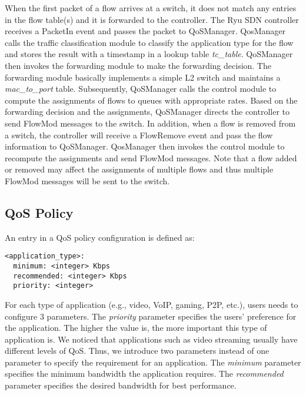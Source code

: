 When the first packet of a flow arrives at a switch, it does not match any entries in the flow table(s) and
it is forwarded to the controller. The Ryu SDN controller receives a \textsf{PacketIn} event and passes the
packet to QoSManager. QosManager calls the traffic classification module to classify the application type for
the flow and stores the result with a timestamp in a lookup table \emph{tc\_table}. QoSManager then invokes
the forwarding module to make the forwarding decision. The forwarding module basically implements a simple L2
switch and maintains a \emph{mac\_to\_port} table. Subsequently, QoSManager calls the control module to compute
the assignments of flows to queues with appropriate rates. Based on the forwarding decision and the assignments,
QoSManager directs the controller to send \textsf{FlowMod} messages to the switch. In addition, when a flow is
removed from a switch, the controller will receive a \textsf{FlowRemove} event and pass the flow information to
QoSManager. QosManager then invokes the control module to recompute the assignments and send \textsf{FlowMod}
messages. Note that a flow added or removed may affect the assignments of multiple flows and thus multiple
\textsf{FlowMod} messages will be sent to the switch. 

\subsection{QoS Policy}
\label{sect:qosPolicy}

An entry in a QoS policy configuration is defined as:

\begin{lstlisting}[basicstyle=\sffamily]
<application_type>:
  minimum: <integer> Kbps
  recommended: <integer> Kbps
  priority: <integer>
\end{lstlisting}

For each type of application (e.g., video, VoIP, gaming, P2P, etc.), users needs to configure 3 parameters. The \emph{priority}
parameter specifies the users' preference for the application. The higher the value is, the more important this type of
application is. We noticed that applications such as video streaming usually have different levels of QoS. Thus, we introduce two
parameters instead of one parameter to specify the requirement for an application. The \emph{minimum} parameter specifies
the minimum bandwidth the application requires. The \emph{recommended} parameter specifies the desired bandwidth for best
performance. 

